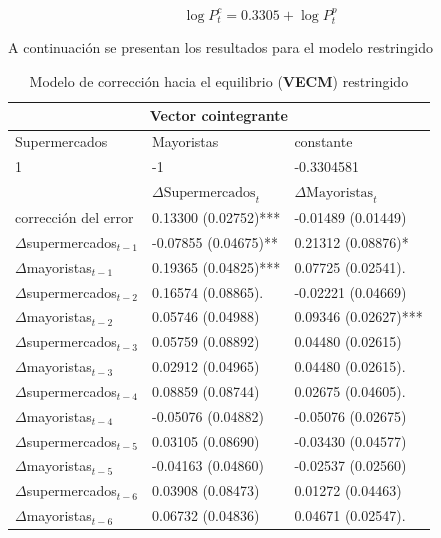 \documentclass[12pt, twoside]{book}\usepackage[]{graphicx}\usepackage[]{color}
\numberwithin{equation}{section}
\numberwithin{theorem}{section}
\numberwithin{teorema}{section}
\numberwithin{defi}{section}
\numberwithin{prop}{section}
\numberwithin{defi}{section}
\theoremstyle{plain}
\begin{document}
\begin{equation}
\log P_{t}^{c} = 0.3305+\log P_{t}^{p}
\end{equation}

A continuación se presentan los resultados para el modelo restringido 



\begin{table}[!htpb]
\centering
\begin{threeparttable}
\caption{Modelo de corrección hacia el equilibrio (\textbf{VECM}) restringido \label{vecm_rest}}
\begin{tabular}{@{}lll@{}}
\toprule
\multicolumn{3}{c}{Vector cointegrante} \\
\midrule 
Supermercados & Mayoristas & constante \\ 
1             & -1 & -0.3304581 \\
\midrule
 & $\Delta \text{Supermercados}_{t} $ & $\Delta \text{Mayoristas}_{t}$ \\ 
 \midrule 
 $\text{corrección del error}$ &  0.13300 (0.02752)***    & -0.01489 (0.01449)  \\     
$\Delta$supermercados$_{t-1} $ & -0.07855 (0.04675)**  &  0.21312 (0.08876)*    \\   
$\Delta$mayoristas$_{t-1}    $ &    0.19365 (0.04825)*** &   0.07725 (0.02541).     \\  
$\Delta$supermercados$_{t-2} $ & 0.16574 (0.08865).    &  -0.02221 (0.04669)   \\   
$\Delta$mayoristas$_{t-2}    $ &  0.05746 (0.04988) & 0.09346 (0.02627)***   \\     
$\Delta$supermercados$_{t-3} $ &  0.05759 (0.08892)    &  0.04480 (0.02615)  \\
$\Delta$mayoristas$_{t-3}    $ &  0.02912 (0.04965)   & 0.04480 (0.02615).     \\   
$\Delta$supermercados$_{t-4} $ &  0.08859 (0.08744)   & 0.02675 (0.04605).   \\     
$\Delta$mayoristas$_{t-4}    $ & -0.05076 (0.04882)    &  -0.05076 (0.02675)  \\   
$\Delta$supermercados$_{t-5} $ & 0.03105 (0.08690)    & -0.03430 (0.04577)   \\     
$\Delta$mayoristas$_{t-5}    $ & -0.04163 (0.04860)    &  -0.02537 (0.02560)  \\   
$\Delta$supermercados$_{t-6} $ &  0.03908 (0.08473)    &  0.01272 (0.04463)  \\     
$\Delta$mayoristas$_{t-6}    $ &  0.06732 (0.04836)   & 0.04671 (0.02547).   \\     

\end{tabular}
\end{threeparttable}
\end{table}
\end{document}
